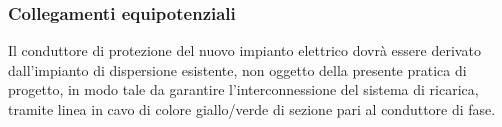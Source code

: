 \subsubsection{Collegamenti equipotenziali}
Il conduttore di protezione del nuovo impianto elettrico dovrà essere derivato dall’impianto di dispersione esistente, non oggetto della presente pratica di progetto, in modo tale da garantire l’interconnessione del sistema di ricarica, tramite linea in cavo di colore giallo/verde di sezione pari al conduttore di fase.